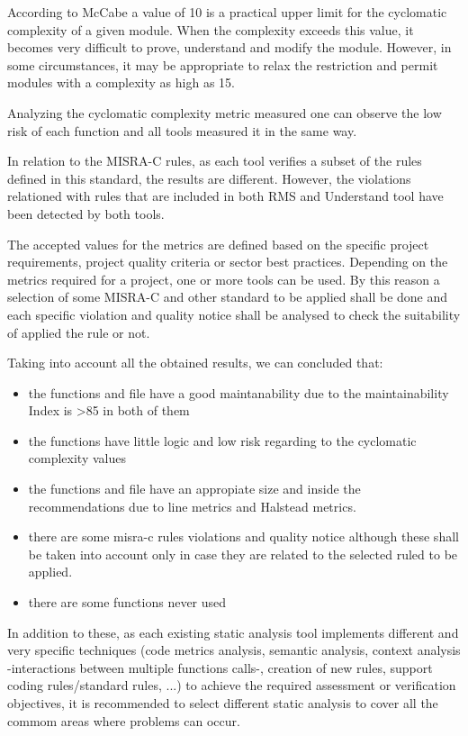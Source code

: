 According to McCabe a value of 10 is a practical upper limit for the cyclomatic complexity of a given module. When the complexity exceeds this value, it becomes very difficult to prove, understand and modify the module. However, in some circumstances, it may be appropriate to relax the restriction and permit modules with a complexity as high as 15.

Analyzing the cyclomatic complexity metric measured one can observe the low risk of each function and all tools measured it in the same way.

In relation to the MISRA-C rules, as each tool verifies a subset of the rules defined in this standard, the results are different. However, the violations relationed with rules that are included in both RMS and Understand tool have been detected by both tools.

The accepted values for the metrics are defined based on the specific project requirements, project quality criteria or sector best practices. Depending on the metrics required for a project, one or more tools can be used. By this reason a selection of some MISRA-C and other standard to be applied shall be done and each specific violation and quality notice shall be analysed to check the suitability of applied the rule or not. 

Taking into account all the obtained results, we can concluded that:
\begin{itemize}
\item the functions and file have a good maintanability due to the maintainability Index is >85 in both of them
\item the functions have little logic and low risk regarding to the cyclomatic complexity values
\item the functions and file have an appropiate size and inside the recommendations due to line metrics and Halstead metrics.
\item there are some misra-c rules violations and quality notice although these shall be taken into account only in case they are related to the selected ruled to be applied.
\item there are some functions never used
\end{itemize}

In addition to these, as each existing static analysis tool implements different and very specific techniques (code metrics analysis, semantic analysis, context analysis -interactions between multiple functions calls-, creation of new rules, support coding rules/standard rules, ...) to achieve the required assessment or verification objectives, it is recommended to select different static analysis to cover all the commom areas where problems can occur.

